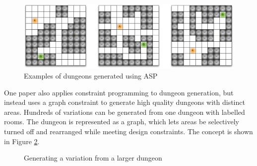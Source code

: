 \begin{figure}[H]
        \centering
        \includegraphics[width=\textwidth, height=0.3\textheight, keepaspectratio]{Images/ASPDungeons.png}
        \caption{Examples of dungeons generated using ASP \cite{pcgbook}}
        \label{fig:aspDungeons}
\end{figure}

One paper \cite{Graph_Constraint_Dungeon} also applies constraint programming to dungeon generation, but instead uses a graph constraint to generate high quality dungeons with distinct areas. Hundreds of variations can be generated from one dungeon with labelled rooms. The dungeon is represented as a graph, which lets areas be selectively turned off and rearranged while meeting design constraints. The concept is shown in Figure \ref{fig:graphDungeon}.

\begin{figure}[H]
    \centering
    \hfill
    \caption{Generating a variation from a larger dungeon \cite{Graph_Constraint_Dungeon}}
    \label{fig:graphDungeon}
\end{figure}

